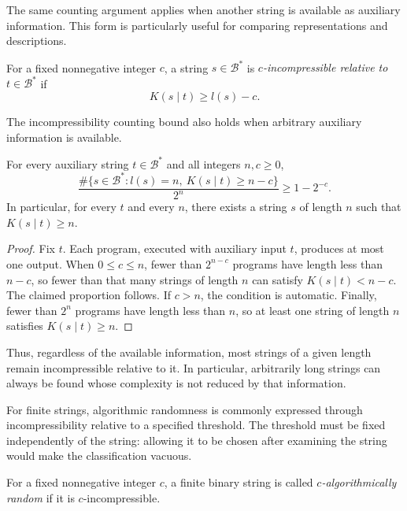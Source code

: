 The same counting argument applies when another string is available as auxiliary information. This form is particularly useful for comparing representations and descriptions.

\begin{definition}
\label{def:conditional-incompressibility}
For a fixed nonnegative integer $c$, a string $s\in\mathcal{B}^*$ is \emph{$c$-incompressible relative to} $t\in\mathcal{B}^*$ if
\[
K(s\mid t)\geq l(s)-c.
\]
\end{definition}

The incompressibility counting bound also holds when arbitrary auxiliary information is available.

\begin{proposition}
\label{prop:conditional-incompressibility-frequency}
For every auxiliary string $t\in\mathcal{B}^*$ and all integers $n,c\geq0$,
\[
\frac{\#\{s\in\mathcal{B}^*:l(s)=n,\ K(s\mid t)\geq n-c\}}{2^n}
\geq 1-2^{-c}.
\]
In particular, for every $t$ and every $n$, there exists a string $s$ of length $n$ such that $K(s\mid t)\geq n$.
\end{proposition}
\begin{proof}
Fix $t$. Each program, executed with auxiliary input $t$, produces at most one output. When $0\leq c\leq n$, fewer than $2^{n-c}$ programs have length less than $n-c$, so fewer than that many strings of length $n$ can satisfy $K(s\mid t)<n-c$. The claimed proportion follows. If $c>n$, the condition is automatic. Finally, fewer than $2^n$ programs have length less than $n$, so at least one string of length $n$ satisfies $K(s\mid t)\geq n$.
\end{proof}

Thus, regardless of the available information, most strings of a given length remain incompressible relative to it. In particular, arbitrarily long strings can always be found whose complexity is not reduced by that information.

For finite strings, algorithmic randomness is commonly expressed through incompressibility relative to a specified threshold. The threshold must be fixed independently of the string: allowing it to be chosen after examining the string would make the classification vacuous.

\begin{definition}
\label{def:finite-algorithmic-randomness}
For a fixed nonnegative integer $c$, a finite binary string is called \emph{$c$-algorithmically random} if it is $c$-incompressible.
\end{definition}

